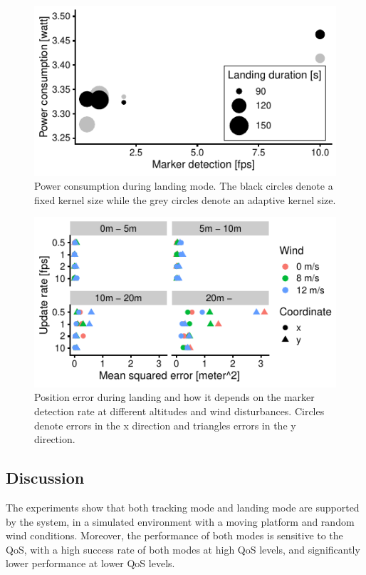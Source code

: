\documentclass[conference]{IEEEtran}
\begin{document}
\begin{figure}[t]
\centering
\includegraphics{data_visualization/PowerLanding.pdf}
\caption{Power consumption during landing mode. 
The black circles denote a fixed kernel size while the grey circles denote an adaptive kernel size.}
\label{fig:PowerDuringLanding}
\end{figure}

\begin{figure}[t]
\centering
\includegraphics{data_visualization/QoSLanding.pdf}
\caption{Position error during landing and how it depends 
on the marker detection rate at different altitudes and wind disturbances.
Circles denote errors in the x direction and triangles 
errors in the y direction.}
\label{fig:PositionErrorDuringLanding}
\end{figure}

\subsection{Discussion}

The experiments show that both tracking mode and landing mode are
supported by the system, in a simulated environment with a moving
platform and random wind conditions. Moreover, the performance of both
modes is sensitive to the QoS, with a high success rate of both modes
at high QoS levels, and significantly lower performance at lower QoS
levels.
\end{document}
